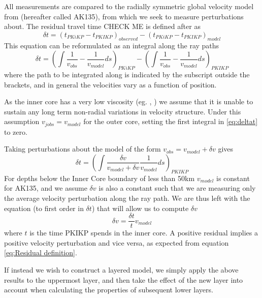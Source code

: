 \documentclass[11pt,a4paper]{article}
\begin{document}
All measurements are compared to the radially symmetric global velocity model from \cite{Kennett1995b} (hereafter called AK135), from which we seek to measure perturbations about. The residual travel time CHECK ME is defined after \cite{Waszek2011a} as
\begin{equation}
	\delta t = \left ( t_{PKiKP} - t_{PKIKP} \right )_{observed} -  \left ( t_{PKiKP} - t_{PKIKP} \right )_{model}
	\label{eq:Residual definition}
\end{equation}
This equation can be reformulated as an integral along the ray paths
\begin{equation}
		\delta t = \left (  \int \frac{1}{v_{obs}} - \frac{1}{v_{model}} ds  \right )_{PKiKP} - \left (  \int \frac{1}{v_{obs}} - \frac{1}{v_{model}} ds \right )_{PKIKP}
		\label{eq:deltat}
\end{equation}
where the path to be integrated along is indicated by the subscript outside the brackets, and in general the velocities vary as a function of position.

As the inner core has a very low viscosity (eg. \cite{Wijs1998}, \cite{Zhang2000}) we assume that it is unable to sustain any long term non-radial variations in velocity structure. Under this assumption $v_{jobs} = v_{model}$ for the outer core, setting the first integral in \eqref{eq:deltat} to zero.

Taking perturbations about the model of the form $v_{obs} = v_{model} + \delta v$ gives
\begin{equation}
	\delta t =\left ( \int \frac{\delta v}{v_{model} + \delta v }\frac{1}{v_{model}} ds \right )_{PKIKP}
\end{equation}
For depths below the Inner Core boundary of less than 50km $v_{model}$ is constant for AK135, and we assume $\delta v$ is also a constant such that we are measuring only the average velocity perturbation along the ray path. We are thus left with the equation (to first order in $\delta t$) that will allow us to compute $\delta v$
\begin{equation}
	\delta v = \frac{\delta t}{t} v_{model}
	\label{eq:Delta v}
\end{equation}
where $t$ is the time PKIKP spends in the inner core. A positive residual implies a positive velocity perturbation and vice versa, as expected from equation \eqref{eq:Residual definition}.

If instead we wish to construct a layered model, we simply apply the above results to the uppermost layer, and then take the effect of the new layer into account when calculating the properties of subsequent lower layers.
\end{document}
